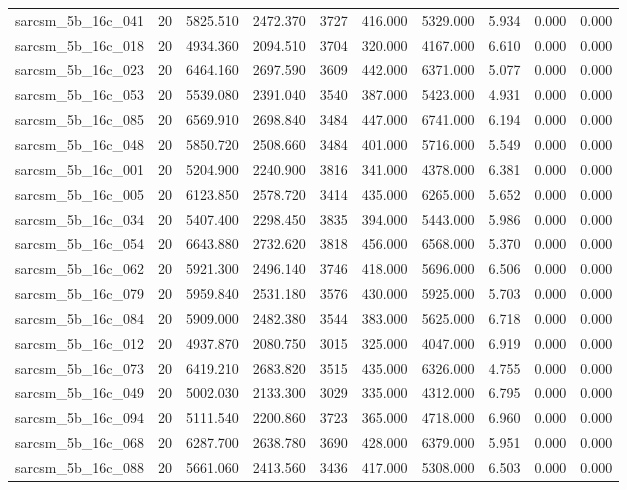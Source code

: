 \begin{tabular}{lrrrrrrrrr}
sarcsm\_5b\_16c\_041 & 20 & 5825.510 & 2472.370 & 3727 & 416.000 & 5329.000 & 5.934 & 0.000 & 0.000 \\
sarcsm\_5b\_16c\_018 & 20 & 4934.360 & 2094.510 & 3704 & 320.000 & 4167.000 & 6.610 & 0.000 & 0.000 \\
sarcsm\_5b\_16c\_023 & 20 & 6464.160 & 2697.590 & 3609 & 442.000 & 6371.000 & 5.077 & 0.000 & 0.000 \\
sarcsm\_5b\_16c\_053 & 20 & 5539.080 & 2391.040 & 3540 & 387.000 & 5423.000 & 4.931 & 0.000 & 0.000 \\
sarcsm\_5b\_16c\_085 & 20 & 6569.910 & 2698.840 & 3484 & 447.000 & 6741.000 & 6.194 & 0.000 & 0.000 \\
sarcsm\_5b\_16c\_048 & 20 & 5850.720 & 2508.660 & 3484 & 401.000 & 5716.000 & 5.549 & 0.000 & 0.000 \\
sarcsm\_5b\_16c\_001 & 20 & 5204.900 & 2240.900 & 3816 & 341.000 & 4378.000 & 6.381 & 0.000 & 0.000 \\
sarcsm\_5b\_16c\_005 & 20 & 6123.850 & 2578.720 & 3414 & 435.000 & 6265.000 & 5.652 & 0.000 & 0.000 \\
sarcsm\_5b\_16c\_034 & 20 & 5407.400 & 2298.450 & 3835 & 394.000 & 5443.000 & 5.986 & 0.000 & 0.000 \\
sarcsm\_5b\_16c\_054 & 20 & 6643.880 & 2732.620 & 3818 & 456.000 & 6568.000 & 5.370 & 0.000 & 0.000 \\
sarcsm\_5b\_16c\_062 & 20 & 5921.300 & 2496.140 & 3746 & 418.000 & 5696.000 & 6.506 & 0.000 & 0.000 \\
sarcsm\_5b\_16c\_079 & 20 & 5959.840 & 2531.180 & 3576 & 430.000 & 5925.000 & 5.703 & 0.000 & 0.000 \\
sarcsm\_5b\_16c\_084 & 20 & 5909.000 & 2482.380 & 3544 & 383.000 & 5625.000 & 6.718 & 0.000 & 0.000 \\
sarcsm\_5b\_16c\_012 & 20 & 4937.870 & 2080.750 & 3015 & 325.000 & 4047.000 & 6.919 & 0.000 & 0.000 \\
sarcsm\_5b\_16c\_073 & 20 & 6419.210 & 2683.820 & 3515 & 435.000 & 6326.000 & 4.755 & 0.000 & 0.000 \\
sarcsm\_5b\_16c\_049 & 20 & 5002.030 & 2133.300 & 3029 & 335.000 & 4312.000 & 6.795 & 0.000 & 0.000 \\
sarcsm\_5b\_16c\_094 & 20 & 5111.540 & 2200.860 & 3723 & 365.000 & 4718.000 & 6.960 & 0.000 & 0.000 \\
sarcsm\_5b\_16c\_068 & 20 & 6287.700 & 2638.780 & 3690 & 428.000 & 6379.000 & 5.951 & 0.000 & 0.000 \\
sarcsm\_5b\_16c\_088 & 20 & 5661.060 & 2413.560 & 3436 & 417.000 & 5308.000 & 6.503 & 0.000 & 0.000 \\

\end{tabular}
